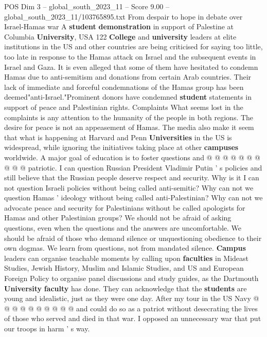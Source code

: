 \begin{textsample}{POS Dim 3 – global\_south\_2023\_11 – Score 9.00 – global\_south\_2023\_11/103765895.txt}  \label{ex:f3_pos_373}
From despair to hope in debate over Israel-Hamas war A \textbf{student} \textbf{demonstration} in support of Palestine at Columbia \textbf{University}, USA 122 \textbf{College} and \textbf{university} leaders at elite institutions in the US and other countries are being criticised for saying too little, too late in response to the Hamas attack on Israel and the subsequent events in Israel and Gaza.
It is even alleged that some of them have hesitated to condemn Hamas due to anti-semitism and donations from certain Arab countries.
Their lack of immediate and forceful condemnations of the Hamas group has been deemed"anti-Israel."Prominent donors have condemned \textbf{student} statements in support of peace and Palestinian rights.
Complaints What seems lost in the complaints is any attention to the humanity of the people in both regions.
The desire for peace is not an appeasement of Hamas.
The media also make it seem that what is happening at Harvard and Penn \textbf{Universities} in the US is widespread, while ignoring the initiatives taking place at other \textbf{campuses} worldwide.
A major goal of education is to foster questions and @ @ @ @ @ @ @ @ @ @ patriotic.
I can question Russian President Vladimir Putin ' s policies and still believe that the Russian people deserve respect and security.
Why is it I can not question Israeli policies without being called anti-semitic?
Why can not we question Hamas ' ideology without being called anti-Palestinian?
Why can not we advocate peace and security for Palestinians without be called apologists for Hamas and other Palestinian groups?
We should not be afraid of asking questions, even when the questions and the answers are uncomfortable.
We should be afraid of those who demand silence or unquestioning obedience to their own dogmas.
We learn from questions, not from mandated silence. \textbf{Campus} leaders can organise teachable moments by calling upon \textbf{faculties} in Mideast Studies, Jewish History, Muslim and Islamic Studies, and US and European Foreign Policy to organise panel discussions and study guides, as the Dartmouth \textbf{University} \textbf{faculty} has done.
They can acknowledge that the \textbf{students} are young and idealistic, just as they were one day.
After my tour in the US Navy @ @ @ @ @ @ @ @ @ @ and could do so as a patriot without desecrating the lives of those who served and died in that war.
I opposed an unnecessary war that put our troops in harm ' s way.

\end{textsample}
